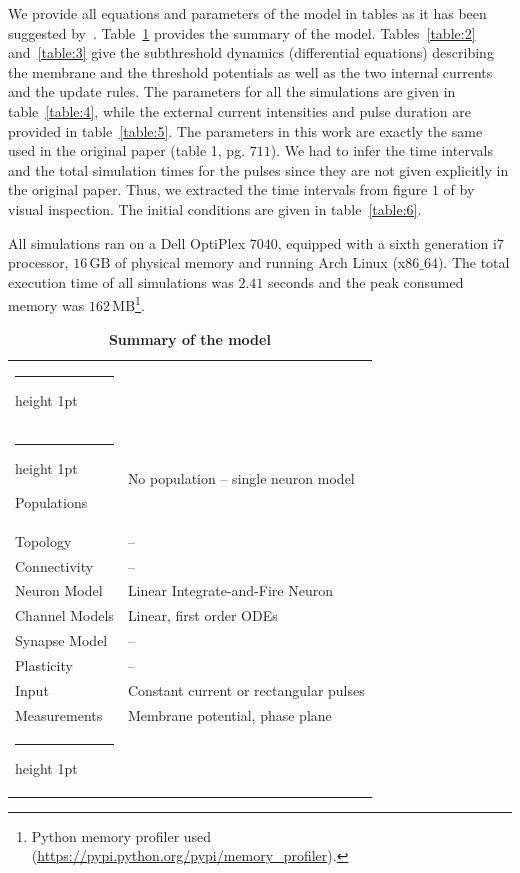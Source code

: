 \documentclass[10pt,a4paper,onecolumn]{article}
\makeatletter
\newcommand{\Rm}[1]{\mathrm{#1}}
\newcommand{\thickhline}{%
    \noalign {\ifnum 0=`}\fi \hrule height 1pt
    \futurelet \reserved@a \@xhline
}
\makeatother
\begin{document}
We provide all equations and parameters of the model in tables as it has been 
suggested by~\cite{nordlie:2009}. 
Table~\ref{table:1} provides the summary of the model. Tables~\ref{table:2}
and~\ref{table:3} give the subthreshold dynamics (differential equations) 
describing the membrane and the threshold potentials as well as the two internal
currents and the update rules. The parameters for all the simulations are given
in table~\ref{table:4}, while the external current intensities and pulse
duration are provided in table~\ref{table:5}. The parameters in this work are 
exactly the same used in the original paper (table 1, pg. $711$). We had to 
infer the time intervals and the total simulation times for the pulses since
they are not given explicitly in the original paper. Thus, we extracted the
time intervals from figure $1$ of \cite{mihalas:2009} by visual inspection. 
The initial conditions are given in table~\ref{table:6}. 

All simulations ran on a Dell OptiPlex $7040$, equipped with a sixth
generation i$7$ processor, $16\, \Rm{GB}$ of physical memory and running Arch
Linux (x$86\_64$). The total execution time of all simulations was $2.41$
seconds and the peak consumed memory was $162\, \Rm{MB}$\footnote{Python memory
profiler used (\url{https://pypi.python.org/pypi/memory_profiler}).}\@. 

\begin{table}[!htbp]
    \centering
    \begin{tabular}{ll}
        \thickhline
        \multicolumn{2}{c}{Model Summary} \\\thickhline
        \rowcolor{Gray}
        Populations  & No population -- single neuron model \\\rowcolor{LightGray}
        Topology     & -- \\ \rowcolor{Gray}
        Connectivity & -- \\ \rowcolor{LightGray}
        Neuron Model & Linear Integrate-and-Fire Neuron \\\rowcolor{Gray}
        Channel Models & Linear, first order ODEs  \\ \rowcolor{LightGray}
        Synapse Model & -- \\ \rowcolor{Gray}
        Plasticity & -- \\ \rowcolor{LightGray}
        Input & Constant current or rectangular pulses \\\rowcolor{Gray}
        Measurements & Membrane potential, phase plane \\
        \thickhline
    \end{tabular}
    \caption{{\bfseries \sffamily Summary of the model}} 
    \label{table:1}
\end{table}
\end{document}
